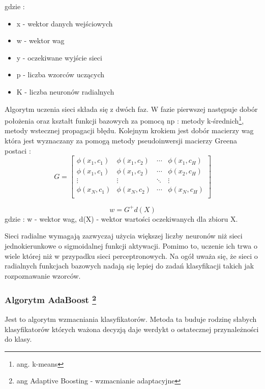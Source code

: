 \documentclass{classrep}
\begin{document}
gdzie :
\begin{itemize}
\item x - wektor danych wejściowych
\item w - wektor wag
\item y - oczekiwane wyjście sieci
\item p - liczba wzorców uczących
\item K - liczba neuronów radialnych
\end{itemize}
Algorytm uczenia sieci składa się z dwóch faz. W fazie pierwszej następuje dobór położenia oraz kształt funkcji bazowych za pomocą np : metody k-średnich\footnote{ang. k-means}, metody wstecznej propagacji błędu. Kolejnym krokiem jest dobór macierzy wag która jest wyznaczany za pomogą metody pseudoinwersji macierzy Greena postaci :
\begin{equation*}
G =
\begin{bmatrix}
        \phi (x_1,c_1) & \phi (x_1,c_2) & \cdots  & \phi (x_1,c_H)\\
        \phi (x_1,c_1) & \phi (x_1,c_2) & \cdots  & \phi (x_2,c_H)\\
        \vdots & \vdots & \ddots  & \vdots \\
        \phi (x_N,c_1) & \phi (x_N,c_2) & \cdots  & \phi (x_N,c_H)\\
\end{bmatrix}
\end{equation*}

\begin{equation}
w = G^{+}d(X)
\end{equation}
gdzie : w - wektor wag, d(X) - wektor wartości oczekiwanych dla zbioru X.

Sieci radialne wymagają zazwyczaj użycia większej liczby neuronów niż sieci jednokierunkowe o sigmoidalnej funkcji aktywacji. Pomimo to, uczenie ich trwa o wiele której niż w przypadku sieci perceptronowych. Na ogół uważa się, że sieci o radialnych funkcjach bazowych nadają się lepiej do zadań klasyfikacji takich jak rozpoznawanie wzorców. 


\subsubsection{Algorytm AdaBoost \footnote{ ang Adaptive Boosting - wzmacnianie adaptacyjne} }
\label{AdaBoostSec}
Jest to algorytm wzmacniania klasyfikatorów. Metoda ta buduje rodzinę słabych klasyfikatorów których ważona decyzją daje werdykt o ostatecznej przynależności do klasy. 
\end{document}
